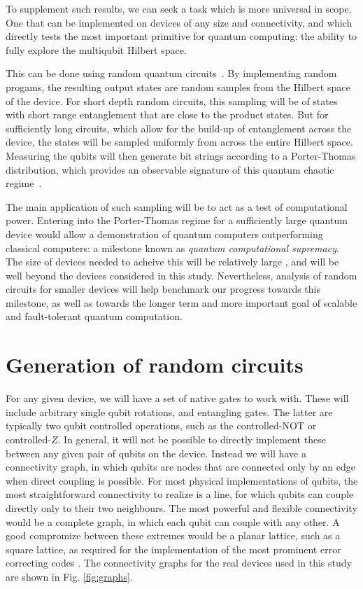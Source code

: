 \documentclass[aps,prl,twocolumn,showpacs,preprintnumbers]{revtex4-1}
\begin{document}
To supplement such results, we can seek a task which is more universal in scope. One that can be implemented on devices of any size and connectivity, and which directly tests the most important primitive for quantum computing: the ability to fully explore the multiqubit Hilbert space.

This can be done using random quantum circuits~\cite{boixo:18}. By implementing random progams, the resulting output states are random samples from the Hilbert space of the device. For short depth random circuits, this sampling will be of states with short range entanglement that are close to the product states. But for sufficiently long circuits, which allow for the build-up of entanglement across the device, the states will be sampled uniformly from across the entire Hilbert space. Measuring the qubits will then generate bit strings according to a Porter-Thomas distribution, which provides an observable signature of this quantum chaotic regime~\cite{boixo:18}.

The main application of such sampling will be to act as a test of computational power. Entering into the Porter-Thomas regime for a sufficiently large quantum device would allow a demonstration of quantum computers outperforming classical computers: a milestone known as \textit{quantum computational supremacy}. The size of devices needed to acheive this will be relatively large \cite{}, and will be well beyond the devices considered in this study. Nevertheless, analysis of random circuits for smaller devices will help benchmark our progress towards this milestone, as well as towards the longer term and more important goal of scalable and fault-tolerant quantum computation.


\section{Generation of random circuits}

For any given device, we will have a set of native gates to work with. These will include arbitrary single qubit rotations, and entangling gates. The latter are typically two qubit controlled operations, such as the controlled-NOT or controlled-$Z$. In general, it will not be possible to directly implement these between any given pair of qubits on the device. Instead we will have a connectivity graph, in which qubits are nodes that are connected only by an edge when direct coupling is possible. For most physical implementations of qubits, the most straightforward connectivity to realize is a line, for which qubits can couple directly only to their two neighbours. The most powerful and flexible connectivity would be a complete graph, in which each qubit can couple with any other. A good compromize between these extremes would be a planar lattice, such as a square lattice, as required for the implementation of the most prominent error correcting codes \cite{}. The connectivity graphs for the real devices used in this study are shown in Fig. \ref{fig:graphs}.
\end{document}
